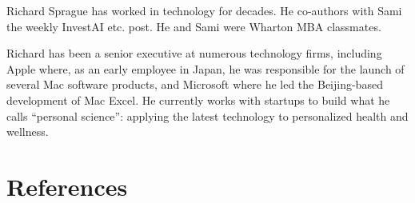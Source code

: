 \documentclass[
  Letterpaper,
]{scrbook}
\begin{document}
Richard Sprague has worked in technology for decades. He co-authors with
Sami the weekly InvestAI etc. post. He and Sami were Wharton MBA
classmates.

Richard has been a senior executive at numerous technology firms,
including Apple where, as an early employee in Japan, he was responsible
for the launch of several Mac software products, and Microsoft where he
led the Beijing-based development of Mac Excel. He currently works with
startups to build what he calls ``personal science'': applying the
latest technology to personalized health and wellness.


\chapter*{References}\label{references}

\end{document}
